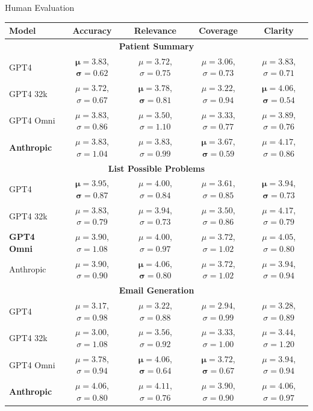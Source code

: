 \documentclass[usenames,dvipsnames]{beamer}
\begin{document}
\begin{frame}[shrink=35]{Human Evaluation}
  
  \vspace{10mm}
  \centering
  \begin{threeparttable}[c]
    \setlength{\extrarowheight}{2pt}
    \begin{tabular}{|l|c|c|c|c|}
    \hline
    Model & Accuracy & Relevance & Coverage & Clarity  \\
    \hline
    \multicolumn{5}{|c|}{\textbf{Patient Summary}} \\
    \hline
    GPT4     & $\mathbf{\mu=3.83}$, $\mathbf{\sigma=0.62}$ & $\mu=3.72$, $\sigma=0.75$ & $\mu=3.06$, $\sigma=0.73$ & $\mu=3.83$, $\sigma=0.71$ \\
    GPT4 32k  & $\mu=3.72$, $\sigma=0.67$ & $\mathbf{\mu=3.78}$, $\mathbf{\sigma=0.81}$ & $\mu=3.22$, $\sigma=0.94$ & $\mathbf{\mu=4.06}$, $\mathbf{\sigma=0.54}$ \\
    GPT4 Omni & $\mu=3.83$, $\sigma=0.86$ & $\mu=3.50$, $\sigma=1.10$ & $\mu=3.33$, $\sigma=0.77$ & $\mu=3.89$, $\sigma=0.76$ \\
    \textbf{Anthropic} & $\mu=3.83$, $\sigma=1.04$ & $\mu=3.83$, $\sigma=0.99$ & $\mathbf{\mu=3.67}$, $\mathbf{\sigma=0.59}$ & $\mu=4.17$, $\sigma=0.86$ \\
    \hline
    \multicolumn{5}{|c|}{\textbf{List Possible Problems}} \\
    \hline
    GPT4      & $\mathbf{\mu=3.95}$, $\mathbf{\sigma=0.87}$ & $\mu=4.00$, $\sigma=0.84$ & $\mu=3.61$, $\sigma=0.85$ & $\mathbf{\mu=3.94}$, $\mathbf{\sigma=0.73}$ \\
    GPT4 32k  & $\mu=3.83$, $\sigma=0.79$ & $\mu=3.94$, $\sigma=0.73$ & $\mu=3.50$, $\sigma=0.86$ & $\mu=4.17$, $\sigma=0.79$ \\
    \textbf{GPT4 Omni}     & $\mu=3.90$, $\sigma=1.08$ & $\mu=4.00$, $\sigma=0.97$ & $\mu=3.72$, $\sigma=1.02$ & $\mu=4.05$, $\sigma=0.80$ \\
    Anthropic & $\mu=3.90$, $\sigma=0.90$ & $\mathbf{\mu=4.06}$, $\mathbf{\sigma=0.80}$ & $\mu=3.72$, $\sigma=1.02$ & $\mu=3.94$, $\sigma=0.94$ \\
    \hline
    \multicolumn{5}{|c|}{\textbf{Email Generation}} \\
    \hline
    GPT4      & $\mu=3.17$, $\sigma=0.98$ & $\mu=3.22$, $\sigma=0.88$ & $\mu=2.94$, $\sigma=0.99$ & $\mu=3.28$, $\sigma=0.89$ \\
    GPT4 32k  & $\mu=3.00$, $\sigma=1.08$ & $\mu=3.56$, $\sigma=0.92$ & $\mu=3.33$, $\sigma=1.00$ & $\mu=3.44$, $\sigma=1.20$ \\
    GPT4 Omni     & $\mu=3.78$, $\sigma=0.94$ & $\mathbf{\mu=4.06}$, $\mathbf{\sigma=0.64}$ & $\mathbf{\mu=3.72}$, $\mathbf{\sigma=0.67}$ & $\mu=3.94$, $\sigma=0.94$ \\
    \textbf{Anthropic} & $\mu=4.06$, $\sigma=0.80$ & $\mu=4.11$, $\sigma=0.76$ & $\mu=3.90$, $\sigma=0.90$ & $\mu=4.06$, $\sigma=0.97$ \\
    \hline
  \end{tabular}
\end{threeparttable}
\end{frame}
\end{document}
